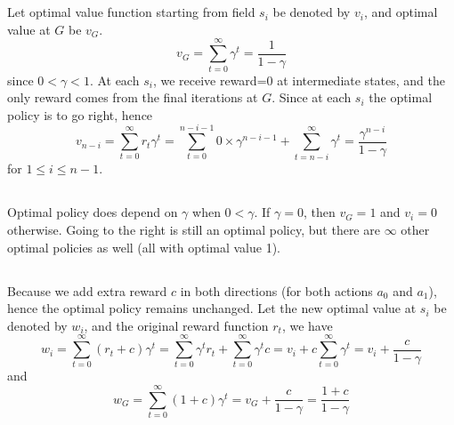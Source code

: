 \section{}\label{question1}

\subsection{}
Let optimal value function starting from field $s_i$ be denoted by $v_i$, and optimal value at $G$ be $v_G$.
\begin{equation*}
 v_G = \sum_{t=0}^\infty \gamma^t = \frac{1}{1-\gamma}
\end{equation*}
since $0<\gamma<1$. At each $s_i$, we receive reward=0 at intermediate states, and the only reward comes from the final iterations at $G$. Since at each $s_i$ the optimal policy is to go right, hence
\begin{equation*}
v_{n-i} = \sum_{t=0}^{\infty} r_t \gamma^t = \sum_{t=0}^{n-i-1} 0 \times \gamma^{n-i-1} + \sum_{t=n-i}^{\infty} \gamma^t= \frac{\gamma^{n-i}}{1-\gamma}
\end{equation*}
for $1\leq i \leq n-1$.

\subsection{}
Optimal policy does depend on $\gamma$ when $0<\gamma$. If $\gamma = 0$, then $v_G = 1$ and $v_i=0$ otherwise. Going to the right is still an optimal policy, but there are $\infty$ other optimal policies as well (all with optimal value 1).

\subsection{}
Because we add extra reward $c$ in both directions (for both actions $a_0$ and $a_1$), hence the optimal policy remains unchanged. Let the new optimal value at $s_i$ be denoted by $w_i$, and the original reward function $r_t$, we have
\begin{equation*}
w_i = \sum_{t=0}^{\infty} (r_t + c)\gamma^t = \sum_{t=0}^{\infty} \gamma^t r_t + \sum_{t=0}^{\infty} \gamma^t c = v_i + c\sum_{t=0}^{\infty} \gamma^t = v_i + \frac{c}{1-\gamma}
\end{equation*}
and 
\begin{equation*}
w_G = \sum_{t=0}^{\infty} (1 + c)\gamma^t = v_G + \frac{c}{1-\gamma} = \frac{1+c}{1-\gamma}
\end{equation*}

